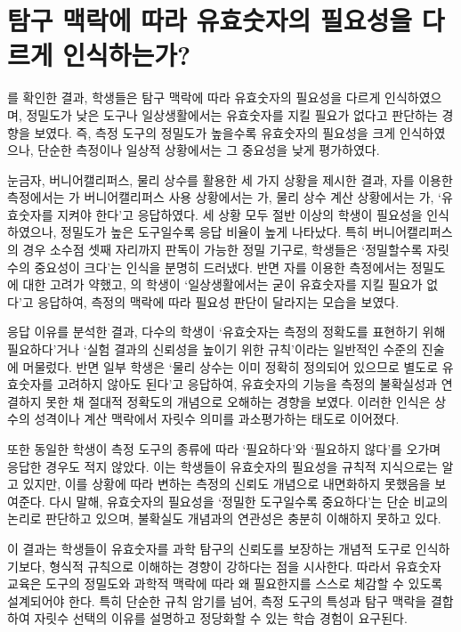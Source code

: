 \section{탐구 맥락에 따라 유효숫자의 필요성을 다르게 인식하는가?}

를 확인한 결과,
%
학생들은 탐구 맥락에 따라 유효숫자의 필요성을 다르게 인식하였으며,
정밀도가 낮은 도구나 일상생활에서는 유효숫자를 지킬 필요가 없다고 판단하는 경향을 보였다.
%
즉, 측정 도구의 정밀도가 높을수록 유효숫자의 필요성을 크게 인식하였으나,
단순한 측정이나 일상적 상황에서는 그 중요성을 낮게 평가하였다.

\SigFigNecessityResponses

눈금자, 버니어캘리퍼스, 물리 상수를 활용한 세 가지 상황을 제시한 결과,
%
자를 이용한 측정에서는 가
버니어캘리퍼스 사용 상황에서는 가,
물리 상수 계산 상황에서는 가,
%
`유효숫자를 지켜야 한다'고 응답하였다.
%
세 상황 모두 절반 이상의 학생이 필요성을 인식하였으나,
정밀도가 높은 도구일수록 응답 비율이 높게 나타났다.
%
특히 버니어캘리퍼스의 경우 소수점 셋째 자리까지 판독이 가능한 정밀 기구로,
학생들은 `정밀할수록 자릿수의 중요성이 크다'는 인식을 분명히 드러냈다.
%
반면 자를 이용한 측정에서는 정밀도에 대한 고려가 약했고, 의 학생이
`일상생활에서는 굳이 유효숫자를 지킬 필요가 없다'고 응답하여,
측정의 맥락에 따라 필요성 판단이 달라지는 모습을 보였다.

응답 이유를 분석한 결과, 다수의 학생이 `유효숫자는 측정의 정확도를 표현하기 위해 필요하다'거나
`실험 결과의 신뢰성을 높이기 위한 규칙'이라는 일반적인 수준의 진술에 머물렀다.
%
반면 일부 학생은 `물리 상수는 이미 정확히 정의되어 있으므로 별도로 유효숫자를 고려하지 않아도 된다'고
응답하여, 유효숫자의 기능을 측정의 불확실성과 연결하지 못한 채
절대적 정확도의 개념으로 오해하는 경향을 보였다.
%
이러한 인식은 상수의 성격이나 계산 맥락에서 자릿수 의미를 과소평가하는 태도로 이어졌다.

또한 동일한 학생이 측정 도구의 종류에 따라 `필요하다'와 `필요하지 않다'를 오가며
응답한 경우도 적지 않았다.
이는 학생들이 유효숫자의 필요성을 규칙적 지식으로는 알고 있지만,
이를 상황에 따라 변하는 측정의 신뢰도 개념으로 내면화하지 못했음을 보여준다.
%
다시 말해, 유효숫자의 필요성을 `정밀한 도구일수록 중요하다'는 단순 비교의 논리로 판단하고 있으며,
불확실도 개념과의 연관성은 충분히 이해하지 못하고 있다.

이 결과는 학생들이 유효숫자를 과학 탐구의 신뢰도를 보장하는 개념적 도구로 인식하기보다,
형식적 규칙으로 이해하는 경향이 강하다는 점을 시사한다.
%
따라서 유효숫자 교육은 도구의 정밀도와 과학적 맥락에 따라
왜 필요한지를 스스로 체감할 수 있도록 설계되어야 한다.
%
특히 단순한 규칙 암기를 넘어, 측정 도구의 특성과 탐구 맥락을 결합하여
자릿수 선택의 이유를 설명하고 정당화할 수 있는 학습 경험이 요구된다.